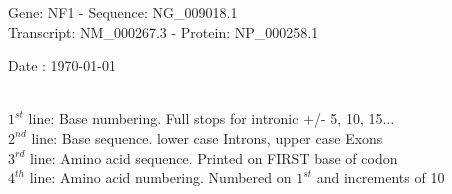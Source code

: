 \documentclass{article}
\begin{document}
\renewcommand{\footrulewidth}{1pt}
\renewcommand{\headrulewidth}{0pt}
\begin{center}
\begin{large}
Gene: NF1 - Sequence: NG\_009018.1\\
Transcript: NM\_000267.3 - Protein: NP\_000258.1
 
 Date : \today\\\\
\end{large}
\end{center}
$1^{st}$ line: Base numbering. Full stops for intronic +/- 5, 10, 15...\\
$2^{nd}$ line: Base sequence. lower case Introns, upper case Exons\\
$3^{rd}$ line: Amino acid sequence. Printed on FIRST base of codon\\
$4^{th}$ line: Amino acid numbering. Numbered on $1^{st}$ and increments of 10\\
\end{document}

